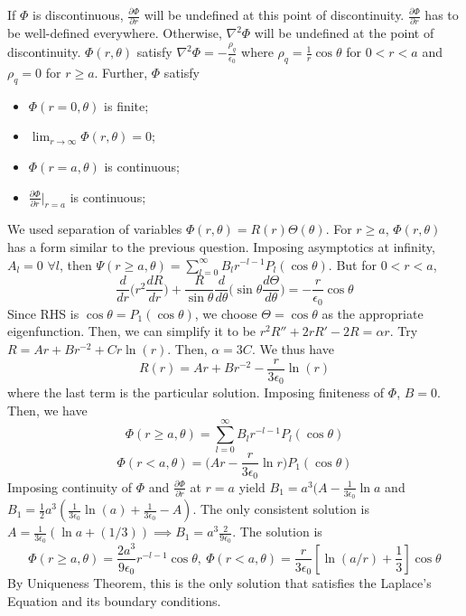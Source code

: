 \documentclass[a4paper]{article}
\begin{document}
\begin{ans}
If $\Phi$ is discontinuous, $\frac{\partial\Phi}{\partial r}$ will be undefined at this point of discontinuity. $\frac{\partial\Phi}{\partial r}$ has to be well-defined everywhere. Otherwise, $\nabla^2\Phi$ will be undefined at the point of discontinuity. 
$\Phi(r,\theta)$ satisfy $\nabla^2\Phi=-\frac{\rho_q}{\epsilon_0}$ where $\rho_q=\frac{1}{r}\cos\theta$ for $0<r<a$ and $\rho_q=0$ for $r\geq a$. Further, $\Phi$ satisfy
\begin{itemize}
    \item $\Phi(r=0,\theta)$ is finite;
    \item $\lim_{r\rightarrow\infty}\Phi(r,\theta)=0$;
    \item $\Phi(r=a,\theta)$ is continuous;
    \item $\frac{\partial\Phi}{\partial r}|_{r=a}$ is continuous;
\end{itemize}
We used separation of variables $\Phi(r,\theta)=R(r)\Theta(\theta)$. For $r\geq a$, $\Phi(r,\theta)$ has a form similar to the previous question. Imposing asymptotics at infinity, $A_l=0$ $\forall l$, then $\Psi(r\geq a,\theta)=\sum_{l=0}^\infty B_lr^{-l-1}P_l(\cos\theta)$. But for $0<r<a$,
$$\frac{d}{dr}\bigg(r^2\frac{dR}{dr}\bigg)+\frac{R}{\sin\theta}\frac{d}{d\theta}\bigg(\sin\theta\frac{d\Theta}{d\theta}\bigg)=-\frac{r}{\epsilon_0}\cos\theta$$
Since RHS is $\cos\theta=P_1(\cos\theta)$, we choose $\Theta=\cos\theta$ as the appropriate eigenfunction. Then, we can simplify it to be $r^2R''+2rR'-2R=\alpha r$. Try $R=Ar+Br^{-2}+Cr\ln(r)$. Then, $\alpha=3C$. We thus have
$$R(r)=Ar+Br^{-2}-\frac{r}{3\epsilon_0}\ln(r)$$
where the last term is the particular solution. Imposing finiteness of $\Phi$, $B=0$. Then, we have
$$\Phi(r\geq a,\theta)=\sum_{l=0}^\infty B_lr^{-l-1}P_l(\cos\theta)$$
$$\Phi(r<a,\theta)=\bigg(Ar-\frac{r}{3\epsilon_0}\ln r\bigg)P_1(\cos\theta)$$
Imposing continuity of $\Phi$ and $\frac{\partial\Phi}{\partial r}$ at $r=a$ yield $B_1=a^3(A-\frac{1}{3\epsilon_0}\ln a$ and $B_1=\frac{1}{2}a^3(\frac{1}{3\epsilon_0}\ln(a)+\frac{1}{3\epsilon_0}-A)$. The only consistent solution is $A=\frac{1}{3\epsilon_0}(\ln a+(1/3))\implies B_1=a^3\frac{2}{9\epsilon_0}$. The solution is
$$\Phi(r\geq a,\theta)=\frac{2a^3}{9\epsilon_0}r^{-l-1}\cos\theta,~\Phi(r<a,\theta)=\frac{r}{3\epsilon_0}[\ln(a/r)+\frac{1}{3}]\cos\theta$$
By Uniqueness Theorem, this is the only solution that satisfies the Laplace's Equation and its boundary conditions. 
\end{ans}
\newpage
\end{document}
